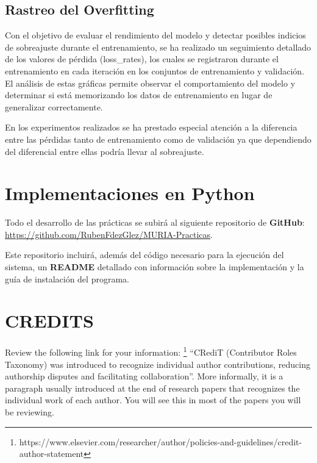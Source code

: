 \documentclass[11pt]{article}
\begin{document}
\subsection{Rastreo del Overfitting}

Con el objetivo de evaluar el rendimiento del modelo y detectar posibles indicios de sobreajuste durante el entrenamiento, se ha realizado un seguimiento detallado de los valores de pérdida (loss\_rates), los cuales se registraron durante el entrenamiento en cada iteración en los conjuntos de entrenamiento y validación. El análisis de estas gráficas permite observar el comportamiento del modelo y determinar si está memorizando los datos de entrenamiento en lugar de generalizar correctamente.

En los experimentos realizados se ha prestado especial atención a la diferencia entre las pérdidas tanto de entrenamiento como de validación ya que dependiendo del diferencial entre ellas podría llevar al sobreajuste.



\section{Implementaciones en Python}
\label{sec:python}

Todo el desarrollo de las prácticas se subirá al siguiente repositorio de \textbf{GitHub}:\\ \url{https://github.com/RubenFdezGlez/MURIA-Practicas}. 

Este repositorio incluirá, además del código necesario para la ejecución del sistema, un \textbf{README} detallado con información sobre la implementación y la guía de instalación del programa.





\section{CREDITS}
\label{sec:credits}
Review the following link for your information: \footnote{https://www.elsevier.com/researcher/author/policies-and-guidelines/credit-author-statement} “CRediT (Contributor Roles Taxonomy) was introduced to recognize individual author contributions, reducing authorship disputes and facilitating collaboration”. More informally, it is a paragraph usually introduced at the end of research papers that recognizes the individual work of each author. You will see this in most of the papers you will be reviewing. 
\end{document}

